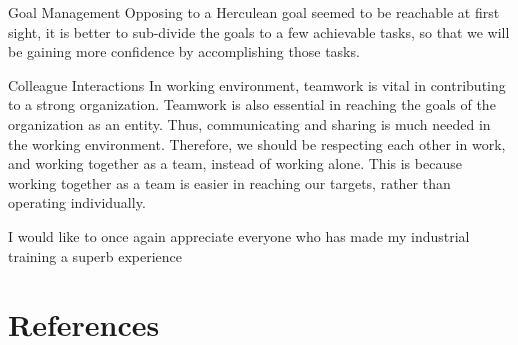 \documentclass[12pt,a4paper]{report}
\begin{document}
Goal Management
Opposing to a Herculean goal seemed to be reachable at first sight, it is better to sub-divide the goals to a few achievable tasks, so that we will be gaining more confidence by accomplishing those tasks. 

Colleague Interactions
In working environment, teamwork is vital in contributing to a strong organization. Teamwork is also essential in reaching the goals of the organization as an entity. Thus, communicating and sharing is much needed in the working environment. Therefore, we should be respecting each other in work, and working together as a team, instead of working alone. This is because working together as a team is easier in reaching our targets, rather than operating individually. 

I would like to once again appreciate everyone who has made my industrial training a superb experience

\chapter{\textbf{References}}
\end{document}
